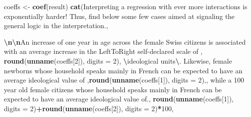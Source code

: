 \documentclass[
]{book}
\newenvironment{Shaded}{\begin{snugshade}}{\end{snugshade}}
\newcommand{\AttributeTok}[1]{\textcolor[rgb]{0.13,0.29,0.53}{#1}}
\newcommand{\DecValTok}[1]{\textcolor[rgb]{0.00,0.00,0.81}{#1}}
\newcommand{\FunctionTok}[1]{\textcolor[rgb]{0.13,0.29,0.53}{\textbf{#1}}}
\newcommand{\NormalTok}[1]{#1}
\newcommand{\OtherTok}[1]{\textcolor[rgb]{0.56,0.35,0.01}{#1}}
\newcommand{\SpecialCharTok}[1]{\textcolor[rgb]{0.81,0.36,0.00}{\textbf{#1}}}
\newcommand{\StringTok}[1]{\textcolor[rgb]{0.31,0.60,0.02}{#1}}
\begin{document}
\begin{Shaded}
\begin{Highlighting}[]
\NormalTok{coeffs }\OtherTok{\textless{}{-}} \FunctionTok{coef}\NormalTok{(result)}
\FunctionTok{cat}\NormalTok{(}\StringTok{\textquotesingle{}Interpreting a regression with ever more interactions is exponentially harder! Thus, find below some few cases aimed at signaling the general logic in the interpretation.\textquotesingle{}}\NormalTok{,}
    
\StringTok{\textquotesingle{}}\SpecialCharTok{\textbackslash{}n\textbackslash{}n}\StringTok{An increase of one year in age across the female Swiss citizens is associated with an average increase in the LeftToRight self{-}declared scale of \textquotesingle{}}\NormalTok{, }\FunctionTok{round}\NormalTok{(}\FunctionTok{unname}\NormalTok{(coeffs[}\DecValTok{2}\NormalTok{]), }\AttributeTok{digits =} \DecValTok{2}\NormalTok{), }\StringTok{\textquotesingle{} }\SpecialCharTok{\textbackslash{}\textquotesingle{}}\StringTok{ideological units}\SpecialCharTok{\textbackslash{}\textquotesingle{}}\StringTok{. Likewise, female newborns whose household speaks mainly in French can be expected to have an average ideological value of \textquotesingle{}}\NormalTok{,}\FunctionTok{round}\NormalTok{(}\FunctionTok{unname}\NormalTok{(coeffs[}\DecValTok{1}\NormalTok{]), }\AttributeTok{digits =} \DecValTok{2}\NormalTok{),}\StringTok{\textquotesingle{}, while a 100 year old female citizens whose household speaks mainly in French can be expected to have an average ideological value of.\textquotesingle{}}\NormalTok{, }\FunctionTok{round}\NormalTok{(}\FunctionTok{unname}\NormalTok{(coeffs[}\DecValTok{1}\NormalTok{]), }\AttributeTok{digits =} \DecValTok{2}\NormalTok{)}\SpecialCharTok{+}\FunctionTok{round}\NormalTok{(}\FunctionTok{unname}\NormalTok{(coeffs[}\DecValTok{2}\NormalTok{]), }\AttributeTok{digits =} \DecValTok{2}\NormalTok{)}\SpecialCharTok{*}\DecValTok{100}\NormalTok{, }


\end{Highlighting}
\end{Shaded}
\end{document}
